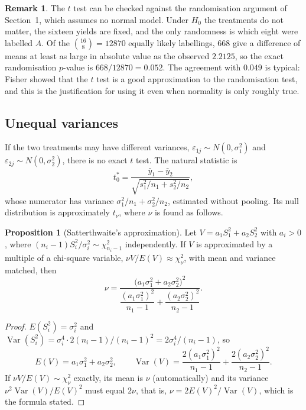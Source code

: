 \documentclass[11pt,a4paper]{article}
\numberwithin{equation}{section}
\DeclareMathOperator{\Var}{Var}
\theoremstyle{definition}
\newtheorem{prop}[thm]{Proposition}
\newtheorem*{remark}{Remark}
\begin{document}
\begin{remark}
The $t$ test can be checked against the randomisation argument of Section~1, which assumes no normal model. Under $H_0$ the treatments do not
matter, the sixteen yields are fixed, and the only randomness is which eight were labelled $A$. Of the $\binom{16}{8} = 12870$ equally likely labellings,
$668$ give a difference of means at least as large in absolute value as the observed $2.2125$, so the exact randomisation $p$-value is
$668/12870 = 0.052$. The agreement with $0.049$ is typical: Fisher showed that the $t$ test is a good approximation to the randomisation test,
and this is the justification for using it even when normality is only roughly true.
\end{remark}

\subsection{Unequal variances}
If the two treatments may have different variances, $\varepsilon_{1j} \sim N(0, \sigma_1^2)$ and $\varepsilon_{2j} \sim N(0, \sigma_2^2)$, there is no exact $t$ test. The natural
statistic is
\[
t_0^* = \frac{\bar y_1 - \bar y_2}{\sqrt{s_1^2/n_1 + s_2^2/n_2}} ,
\]
whose numerator has variance $\sigma_1^2/n_1 + \sigma_2^2/n_2$, estimated without pooling. Its null distribution is approximately $t_\nu$, where $\nu$ is found as
follows.

\begin{prop}[Satterthwaite's approximation]\label{prop:satterthwaite}
Let $V = a_1S_1^2 + a_2S_2^2$ with $a_i > 0$, where $(n_i - 1)S_i^2/\sigma_i^2 \sim \chi^2_{n_i-1}$ independently. If $V$ is approximated by a multiple of a chi-square
variable, $\nu V/E(V) \approx \chi^2_\nu$, with mean and variance matched, then
\[
\nu = \frac{\bigl(a_1\sigma_1^2 + a_2\sigma_2^2\bigr)^2}{\dfrac{(a_1\sigma_1^2)^2}{n_1 - 1} + \dfrac{(a_2\sigma_2^2)^2}{n_2 - 1}} .
\]
\end{prop}

\begin{proof}
$E(S_i^2) = \sigma_i^2$ and $\Var(S_i^2) = \sigma_i^4\cdot2(n_i - 1)/(n_i - 1)^2 = 2\sigma_i^4/(n_i - 1)$, so
\[
E(V) = a_1\sigma_1^2 + a_2\sigma_2^2 , \qquad \Var(V) = \frac{2(a_1\sigma_1^2)^2}{n_1 - 1} + \frac{2(a_2\sigma_2^2)^2}{n_2 - 1} .
\]
If $\nu V/E(V) \sim \chi^2_\nu$ exactly, its mean is $\nu$ (automatically) and its variance $\nu^2\Var(V)/E(V)^2$ must equal $2\nu$, that is,
$\nu = 2E(V)^2/\Var(V)$, which is the formula stated.
\end{proof}
\end{document}
